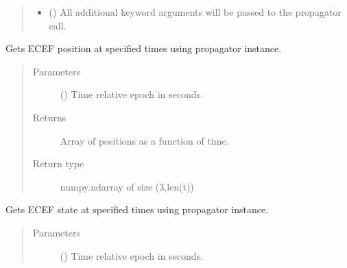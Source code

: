 \documentclass[letterpaper,10pt,english]{sphinxmanual}
\begin{document}
\begin{fulllineitems}
\begin{fulllineitems}
\begin{quote}
\begin{description}
\begin{itemize}
\item {} 
 () \textendash{} All additional keyword arguments will be passed to the propagator call.

\end{itemize}

\end{description}\end{quote}

\end{fulllineitems}


\begin{fulllineitems}
\label{\detokenize{modules/space_object:space_object.SpaceObject.diam}}
\end{fulllineitems}


\begin{fulllineitems}
\label{\detokenize{modules/space_object:space_object.SpaceObject.get_orbit}}
Gets ECEF position at specified times using propagator instance.
\begin{quote}\begin{description}
\item[{Parameters}] \leavevmode
{} () \textendash{} Time relative epoch in seconds.

\item[{Returns}] \leavevmode
Array of positions as a function of time.

\item[{Return type}] \leavevmode
numpy.ndarray of size (3,len(t))

\end{description}\end{quote}

\end{fulllineitems}


\begin{fulllineitems}
\label{\detokenize{modules/space_object:space_object.SpaceObject.get_state}}
Gets ECEF state at specified times using propagator instance.
\begin{quote}\begin{description}
\item[{Parameters}] \leavevmode
{} () \textendash{} Time relative epoch in seconds.


\end{description}
\end{quote}
\end{fulllineitems}
\end{fulllineitems}
\end{document}
